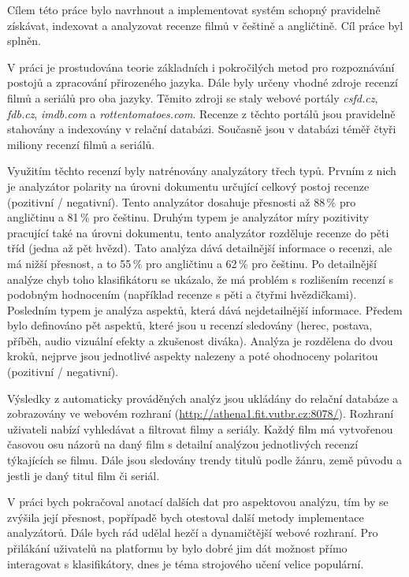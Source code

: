 Cílem této práce bylo navrhnout a implementovat systém schopný pravidelně získávat, indexovat a analyzovat recenze filmů v češtině a angličtině. Cíl práce byl splněn. 

V práci je prostudována teorie základních i pokročilých metod pro rozpoznávání postojů a zpracování přirozeného jazyka. Dále byly určeny vhodné zdroje recenzí filmů a seriálů pro oba jazyky. Těmito zdroji se staly webové portály \emph{csfd.cz}, \emph{fdb.cz}, \emph{imdb.com} a \emph{rottentomatoes.com}. Recenze z těchto portálů jsou pravidelně stahovány a indexovány v relační databázi. Současně jsou v databázi téměř čtyři miliony recenzí filmů a seriálů. 

Využitím těchto recenzí byly natrénovány analyzátory třech typů. Prvním z nich je analyzátor polarity na úrovni dokumentu určující celkový postoj recenze (pozitivní / negativní). Tento analyzátor dosahuje přesnosti až 88\,\% pro angličtinu a 81\,\% pro češtinu. Druhým typem je analyzátor míry pozitivity pracující také na úrovni dokumentu, tento analyzátor rozděluje recenze do pěti tříd (jedna až pět hvězd). Tato analýza dává detailnější informace o recenzi, ale má nižší přesnost, a to 55\,\% pro angličtinu a 62\,\% pro češtinu. Po detailnější analýze chyb toho klasifikátoru se ukázalo, že má problém s rozlišením recenzí s podobným hodnocením (například recenze s pěti a čtyřmi hvězdičkami). Posledním typem je analýza aspektů, která dává nejdetailnější informace. Předem bylo definováno pět aspektů, které jsou u recenzí sledovány (herec, postava, příběh, audio vizuální efekty a zkušenost diváka). Analýza je rozdělena do dvou kroků, nejprve jsou jednotlivé aspekty nalezeny a poté ohodnoceny polaritou (pozitivní / negativní).

Výsledky z automaticky prováděných analýz jsou ukládány do relační databáze a zobrazovány ve webovém rozhraní (\url{http://athena1.fit.vutbr.cz:8078/}). Rozhraní uživateli nabízí vyhledávat a filtrovat filmy a seriály. Každý film má vytvořenou časovou osu názorů na daný film s detailní analýzou jednotlivých recenzí týkajících se filmu. Dále jsou sledovány trendy titulů podle žánru, země původu a jestli je daný titul film či seriál. 

V práci bych pokračoval anotací dalších dat pro aspektovou analýzu, tím by se zvýšila její přesnost, popřípadě bych otestoval další metody implementace analyzátorů. Dále bych rád udělal hezčí a dynamičtější webové rozhraní. Pro přilákání uživatelů na platformu by bylo dobré jim dát možnost přímo interagovat s klasifikátory, dnes je téma strojového učení velice populární.    